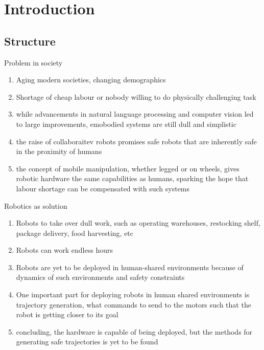 \chapter{Introduction} %
\label{cha:Introduction}


\section{Structure}

Problem in society
\begin{enumerate}
  \item Aging modern societies, changing demographics
  \item Shortage of cheap labour or nobody willing to do physically challenging
  task
  \item while advancements in natural language processing and computer vision
  led to large improvements, emobodied systems are still dull and simplistic
  \item the raise of collaboraitev robots promises safe robots that are
  inherently safe in the proximity of humans
  \item the concept of mobile manipulation, whether legged or on wheels, gives
  robotic hardware the same capabilities as humans, sparking the hope that
  labour shortage can be compensated with such systems
\end{enumerate}
Robotics as solution
\begin{enumerate}
  \item Robots to take over dull work, such as operating warehouses, restocking
  shelf, package delivery, food harvesting, etc
  \item Robots can work endless hours
  \item Robots are yet to be deployed in human-shared environments because of
  dynamics of such environments and safety constraints
  \item One important part for deploying robots in human shared environments is
  trajectory generation, what commands to send to the motors such that the robot
  is getting closer to its goal
  \item concluding, the hardware is capable of being deployed, but the methods
  for generating safe trajectories is yet to be found
\end{enumerate}
